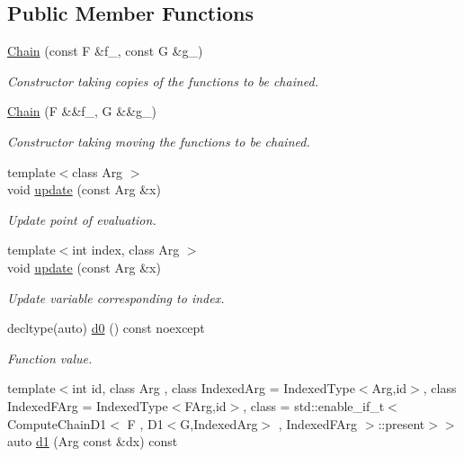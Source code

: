 \subsection*{Public Member Functions}
\begin{DoxyCompactItemize}
\item 
\hyperlink{structFunG_1_1MathematicalOperations_1_1Chain_a3167b6304026eb0bd92e57d0dd0087e0}{Chain} (const F \&f\-\_\-, const G \&g\-\_\-)
\begin{DoxyCompactList}\small\item\em Constructor taking copies of the functions to be chained. \end{DoxyCompactList}\item 
\hyperlink{structFunG_1_1MathematicalOperations_1_1Chain_a0c5cc51c17c31db3754edc016a745201}{Chain} (F \&\&f\-\_\-, G \&\&g\-\_\-)
\begin{DoxyCompactList}\small\item\em Constructor taking moving the functions to be chained. \end{DoxyCompactList}\item 
{\footnotesize template$<$class Arg $>$ }\\void \hyperlink{structFunG_1_1MathematicalOperations_1_1Chain_adb7f63859ef7dbdd08b0908c3a17794d}{update} (const Arg \&x)
\begin{DoxyCompactList}\small\item\em Update point of evaluation. \end{DoxyCompactList}\item 
{\footnotesize template$<$int index, class Arg $>$ }\\void \hyperlink{structFunG_1_1MathematicalOperations_1_1Chain_aa41d754e68072e0a9f1460da79f9913e}{update} (const Arg \&x)
\begin{DoxyCompactList}\small\item\em Update variable corresponding to index. \end{DoxyCompactList}\item 
decltype(auto) \hyperlink{structFunG_1_1MathematicalOperations_1_1Chain_a96de3ba6edeb9decba4c04ad9ddb48ff}{d0} () const noexcept
\begin{DoxyCompactList}\small\item\em Function value. \end{DoxyCompactList}\item 
{\footnotesize template$<$int id, class Arg , class Indexed\-Arg  = Indexed\-Type$<$\-Arg,id$>$, class Indexed\-F\-Arg  = Indexed\-Type$<$\-F\-Arg,id$>$, class  = std\-::enable\-\_\-if\-\_\-t$<$ Compute\-Chain\-D1$<$ F , D1$<$\-G,\-Indexed\-Arg$>$ , Indexed\-F\-Arg $>$\-::present$>$$>$ }\\auto \hyperlink{structFunG_1_1MathematicalOperations_1_1Chain_adfe741dee89257258b39df846fd16cf7}{d1} (Arg const \&dx) const 

\end{DoxyCompactItemize}
